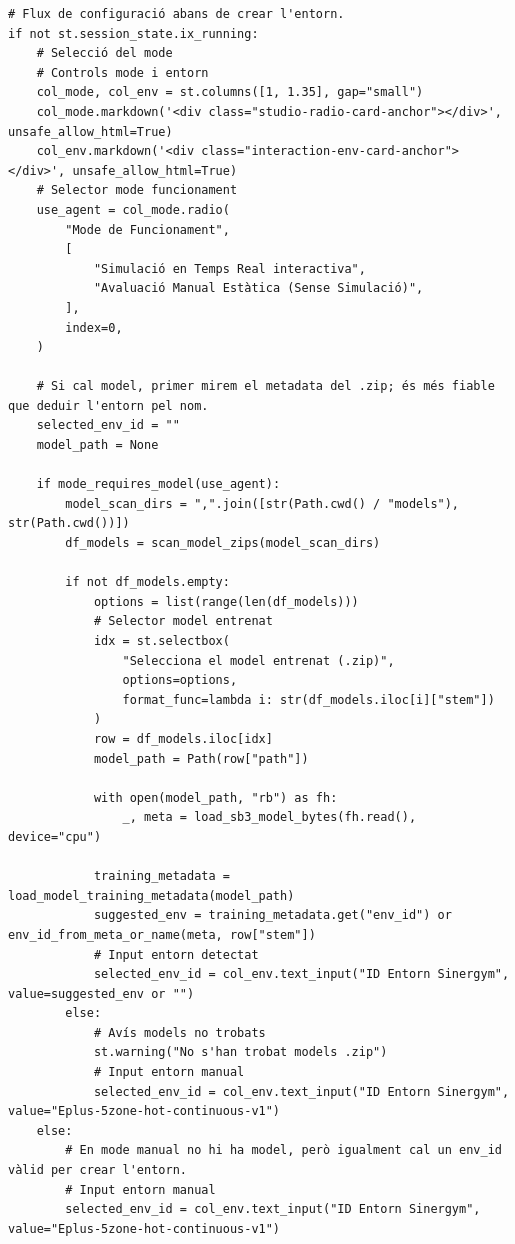 \documentclass[10pt,a4paper]{article}
\begin{document}
\begin{lstlisting}[style=studioPython,caption={pages/Interaccionar\_amb\_l'Agent.py},label={lst:pages-interaccionar-amb-l-agent-py}]
# Flux de configuració abans de crear l'entorn.
if not st.session_state.ix_running:
    # Selecció del mode
    # Controls mode i entorn
    col_mode, col_env = st.columns([1, 1.35], gap="small")
    col_mode.markdown('<div class="studio-radio-card-anchor"></div>', unsafe_allow_html=True)
    col_env.markdown('<div class="interaction-env-card-anchor"></div>', unsafe_allow_html=True)
    # Selector mode funcionament
    use_agent = col_mode.radio(
        "Mode de Funcionament",
        [
            "Simulació en Temps Real interactiva",
            "Avaluació Manual Estàtica (Sense Simulació)",
        ],
        index=0,
    )

    # Si cal model, primer mirem el metadata del .zip; és més fiable que deduir l'entorn pel nom.
    selected_env_id = ""
    model_path = None

    if mode_requires_model(use_agent):
        model_scan_dirs = ",".join([str(Path.cwd() / "models"), str(Path.cwd())])
        df_models = scan_model_zips(model_scan_dirs)

        if not df_models.empty:
            options = list(range(len(df_models)))
            # Selector model entrenat
            idx = st.selectbox(
                "Selecciona el model entrenat (.zip)",
                options=options,
                format_func=lambda i: str(df_models.iloc[i]["stem"])
            )
            row = df_models.iloc[idx]
            model_path = Path(row["path"])

            with open(model_path, "rb") as fh:
                _, meta = load_sb3_model_bytes(fh.read(), device="cpu")

            training_metadata = load_model_training_metadata(model_path)
            suggested_env = training_metadata.get("env_id") or env_id_from_meta_or_name(meta, row["stem"])
            # Input entorn detectat
            selected_env_id = col_env.text_input("ID Entorn Sinergym", value=suggested_env or "")
        else:
            # Avís models no trobats
            st.warning("No s'han trobat models .zip")
            # Input entorn manual
            selected_env_id = col_env.text_input("ID Entorn Sinergym", value="Eplus-5zone-hot-continuous-v1")
    else:
        # En mode manual no hi ha model, però igualment cal un env_id vàlid per crear l'entorn.
        # Input entorn manual
        selected_env_id = col_env.text_input("ID Entorn Sinergym", value="Eplus-5zone-hot-continuous-v1")


\end{lstlisting}
\end{document}
